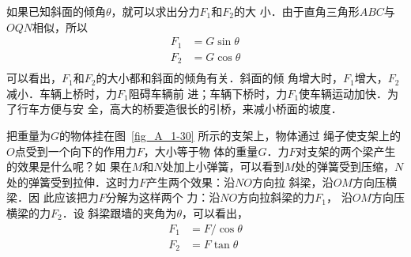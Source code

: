     如果已知斜面的倾角$\theta$，就可以求出分力$F_1$和$F_2$的大
小．由于直角三角形$ABC$与$OQN$相似，所以
\[\begin{split} 
F_1&= G\sin\theta \\
F_2&= G\cos\theta \\
\end{split}  \]
可以看出，$F_1$和$F_2$的大小都和斜面的倾角有关．斜面的倾
角增大时，$F_1$增大，$F_2$减小．车辆上桥时，力$F_1$阻碍车辆前
进；车辆下桥时，力$F_1$使车辆运动加快．为了行车方便与安
全，高大的桥要造很长的引桥，来减小桥面的坡度．

    把重量为$G$的物体挂在图~\ref{fig_A_1-30} 所示的支架上，物体通过
绳子使支架上的$O$点受到一个向下的作用力$F$，大小等于物
体的重量$G$．力$F$对支架的两个梁产生的效果是什么呢？如
果在$M$和$N$处加上小弹簧，可以看到$M$处的弹簧受到压缩，$N$
处的弹簧受到拉伸．这时力$F$产生两个效果：沿$NO$方向拉
斜梁，沿$OM$方向压横梁．因
此应该把力$F$分解为这样两个
力：沿$NO$方向拉斜梁的力$F_1$，
沿$OM$方向压横梁的力$F_2$．设
斜梁跟墙的夹角为$\theta$，可以看出，
\[\begin{split} 
F_1&= F/\cos\theta \\
F_2&= F\tan\theta \\
\end{split}  \]

